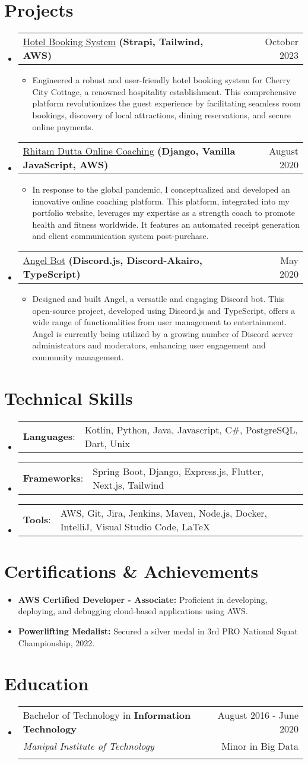 \documentclass[letterpaper,11pt]{article}
\makeatletter
\newcommand{\sectionStart}{
  \begin{itemize}[label={},leftmargin=0in]
}
\newcommand{\sectionEnd}{
  \end{itemize}
}
\newcommand{\educationItem}[5]{
  \vspace{-1pt}
  \item
  \begin{tabular*}{\textwidth}{l@{\extracolsep{\fill}}r@{}}
    {#1 in \textbf{#2}}  & {#3}\\
    {\textit{#4}} & {#5}\\\vspace{-18pt}
  \end{tabular*}
  \vspace{-5pt}
}
\newcommand{\skillItem}[2]{
  \vspace{-1pt}
  \item
  \begin{tabular*}{1.0\textwidth}{l@{}l@{}}
    \footnotesize{\textbf{#1}: } & \footnotesize{#2}
  \end{tabular*}\vspace{-22pt}
}
\newcommand{\projectHeading}[4]{
  \vspace{-1pt}
  \item
  \begin{tabular*}{1.0\textwidth}{l@{\extracolsep{\fill}}r@{}}
    \small{{\href{#1}{#2}} \textbf{#3}} & \small{#4} \\
  \end{tabular*}\vspace{-5pt}
}
\newcommand{\listStart}{\begin{itemize}}
\newcommand{\listEnd}{\end{itemize}\vspace{-6pt}}
\newcommand{\bulletItem}[1]{
  \item
  \small{
    {#1 \vspace{-1.8pt}}
  }
}
\newcommand{\certItem}[2]{
  \item \footnotesize{\textbf{#1} #2} \vspace{-18pt}
}
\makeatother
\begin{document}
\section{Projects}
\sectionStart
\projectHeading
    {https://github.com/exthazor/CherryCityCottage-Frontend/}
    {Hotel Booking System}
    {(Strapi, Tailwind, AWS)}
    {October 2023}
  \listStart
    \bulletItem
      {Engineered a robust and user-friendly hotel booking system for Cherry City Cottage, a renowned hospitality establishment. This comprehensive platform revolutionizes the guest experience by facilitating seamless room bookings, discovery of local attractions, dining reservations, and secure online payments.}
  \listEnd
  \projectHeading
    {https://github.com/exthazor/rhitamdutta/}
    {Rhitam Dutta Online Coaching}
    {(Django, Vanilla JavaScript, AWS)}
    {August 2020}
  \listStart
    \bulletItem
      {In response to the global pandemic, I conceptualized and developed an innovative online coaching platform. This platform, integrated into my portfolio website, leverages my expertise as a strength coach to promote health and fitness worldwide. It features an automated receipt generation and client communication system post-purchase.}
  \listEnd
  \projectHeading
    {https://github.com/exthazor/angel}
    {Angel Bot}
    {(Discord.js, Discord-Akairo, TypeScript)}
    {May 2020}
  \listStart
    \bulletItem
    {Designed and built Angel, a versatile and engaging Discord bot. This open-source project, developed using Discord.js and TypeScript, offers a wide range of functionalities from user management to entertainment. Angel is currently being utilized by a growing number of Discord server administrators and moderators, enhancing user engagement and community management.}
  \listEnd
\sectionEnd

\section{Technical Skills}
\sectionStart
  \skillItem
    {Languages}
    {Kotlin, Python, Java, Javascript, C\#, PostgreSQL, Dart, Unix}
  \skillItem
    {Frameworks}
    {Spring Boot, Django, Express.js, Flutter, Next.js, Tailwind}
  \skillItem
    {Tools}
    {AWS, Git, Jira, Jenkins, Maven, Node.js, Docker, IntelliJ, Visual Studio Code, \LaTeX\ }
  \vspace{3pt}
\sectionEnd

\section{Certifications \& Achievements}
\sectionStart
    \certItem 
     {AWS Certified Developer - Associate:} {Proficient in developing, deploying, and debugging cloud-based applications using AWS.}
    \certItem 
     {Powerlifting Medalist:} {Secured a silver medal in 3rd PRO National Squat Championship, 2022.}
\sectionEnd


\section{Education}
\sectionStart
  \educationItem
    {Bachelor of Technology} 
    {Information Technology} 
    {August 2016 - June 2020}
    {Manipal Institute of Technology} 
    {Minor in Big Data}
\sectionEnd
\end{document}
